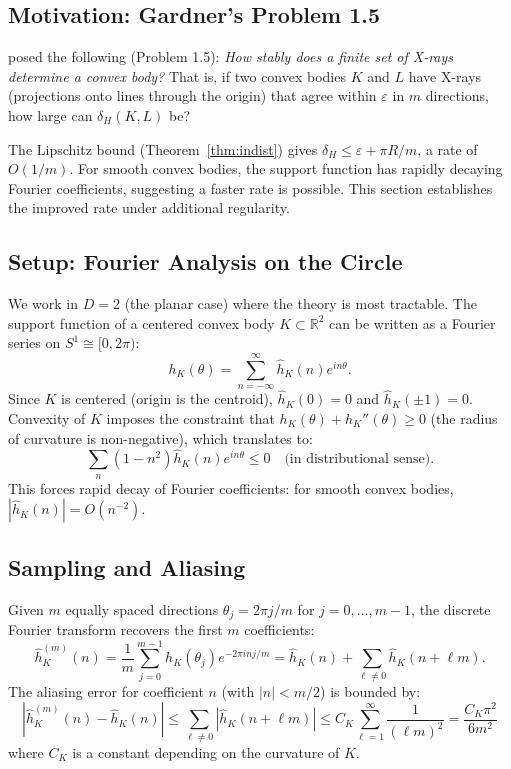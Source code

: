 \subsection{Motivation: Gardner's Problem 1.5}

\citet{gardner1995geometric} posed the following (Problem 1.5): \emph{How stably does a finite set of X-rays determine a convex body?} That is, if two convex bodies $K$ and $L$ have X-rays (projections onto lines through the origin) that agree within $\varepsilon$ in $m$ directions, how large can $\delta_H(K, L)$ be?

The Lipschitz bound (Theorem~\ref{thm:indist}) gives $\delta_H \leq \varepsilon + \pi R/m$, a rate of $O(1/m)$. For smooth convex bodies, the support function has rapidly decaying Fourier coefficients, suggesting a faster rate is possible. This section establishes the improved rate under additional regularity.

\subsection{Setup: Fourier Analysis on the Circle}

We work in $D = 2$ (the planar case) where the theory is most tractable. The support function of a centered convex body $K \subset \mathbb{R}^2$ can be written as a Fourier series on $S^1 \cong [0, 2\pi)$:
\[
  h_K(\theta) = \sum_{n=-\infty}^{\infty} \hat{h}_K(n) e^{in\theta}.
\]
Since $K$ is centered (origin is the centroid), $\hat{h}_K(0) = 0$ and $\hat{h}_K(\pm 1) = 0$. Convexity of $K$ imposes the constraint that $h_K(\theta) + h_K''(\theta) \geq 0$ (the radius of curvature is non-negative), which translates to:
\[
  \sum_{n} (1 - n^2) \hat{h}_K(n) e^{in\theta} \leq 0 \quad \text{(in distributional sense)}.
\]
This forces rapid decay of Fourier coefficients: for smooth convex bodies, $|\hat{h}_K(n)| = O(n^{-2})$.

\subsection{Sampling and Aliasing}

Given $m$ equally spaced directions $\theta_j = 2\pi j / m$ for $j = 0, \ldots, m-1$, the discrete Fourier transform recovers the first $m$ coefficients:
\[
  \hat{h}_K^{(m)}(n) = \frac{1}{m} \sum_{j=0}^{m-1} h_K(\theta_j) e^{-2\pi i n j / m} = \hat{h}_K(n) + \sum_{\ell \neq 0} \hat{h}_K(n + \ell m).
\]
The aliasing error for coefficient $n$ (with $|n| < m/2$) is bounded by:
\[
  |\hat{h}_K^{(m)}(n) - \hat{h}_K(n)| \leq \sum_{\ell \neq 0} |\hat{h}_K(n + \ell m)| \leq C_K \sum_{\ell=1}^{\infty} \frac{1}{(\ell m)^2} = \frac{C_K \pi^2}{6 m^2}
\]
where $C_K$ is a constant depending on the curvature of $K$.

